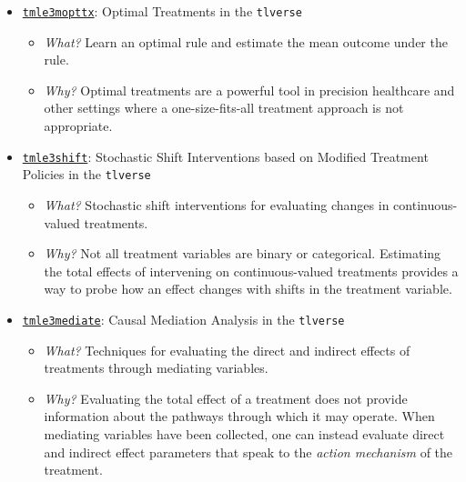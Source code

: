 \documentclass[
  12pt, krantz2,
]{krantz}
\newcommand{\passthrough}[1]{#1}
\providecommand{\tightlist}{%
  \setlength{\itemsep}{0pt}\setlength{\parskip}{0pt}}
\newcommand{\1}{\mathbbm{1}}
\theoremstyle{definition}
\theoremstyle{definition}
\theoremstyle{definition}
\theoremstyle{definition}
\theoremstyle{remark}
\begin{document}
\begin{itemize}
\tightlist
\item
  \href{https://github.com/tlverse/tmle3mopttx}{\passthrough{\lstinline!tmle3mopttx!}}: Optimal Treatments
  in the \passthrough{\lstinline!tlverse!}

  \begin{itemize}
  \tightlist
  \item
    \emph{What?} Learn an optimal rule and estimate the mean outcome under the rule.
  \item
    \emph{Why?} Optimal treatments are a powerful tool in precision healthcare and
    other settings where a one-size-fits-all treatment approach is not
    appropriate.
  \end{itemize}
\item
  \href{https://github.com/tlverse/tmle3shift}{\passthrough{\lstinline!tmle3shift!}}: Stochastic Shift
  Interventions based on Modified Treatment Policies in the \passthrough{\lstinline!tlverse!}

  \begin{itemize}
  \tightlist
  \item
    \emph{What?} Stochastic shift interventions for evaluating changes in
    continuous-valued treatments.
  \item
    \emph{Why?} Not all treatment variables are binary or categorical. Estimating the
    total effects of intervening on continuous-valued treatments provides a way
    to probe how an effect changes with shifts in the treatment variable.
  \end{itemize}
\item
  \href{https://github.com/tlverse/tmle3mediate}{\passthrough{\lstinline!tmle3mediate!}}: Causal Mediation
  Analysis in the \passthrough{\lstinline!tlverse!}

  \begin{itemize}
  \tightlist
  \item
    \emph{What?} Techniques for evaluating the direct and indirect effects of
    treatments through mediating variables.
  \item
    \emph{Why?} Evaluating the total effect of a treatment does not provide
    information about the pathways through which it may operate. When mediating
    variables have been collected, one can instead evaluate direct and indirect
    effect parameters that speak to the \emph{action mechanism} of the treatment.
  \end{itemize}
\end{itemize}
\end{document}
